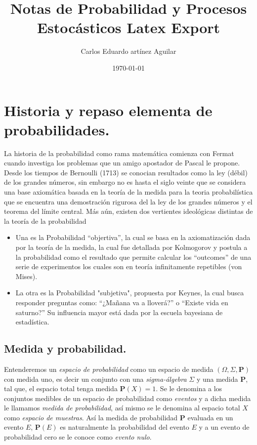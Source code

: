 \documentclass[letterpaper]{article}
\author{Carlos Eduardo artínez Aguilar}
\date{\today}
\title{Notas de Probabilidad y Procesos Estocásticos Latex Export}
\begin{document}
\maketitle
\tableofcontents


\section{Historia y repaso elementa de probabilidades.}
\label{sec:org56c8fcb}

\noindent La historia de la probabilidad como rama matemática comienza con Fermat cuando investiga los problemas que un amigo apostador de Pascal le propone. Desde los tiempos de Bernoulli (1713) se conocian resultados como la ley (débil) de los grandes números, sin embargo no es hasta el siglo veinte que se considera una base axiomática basada en la teoría de la medida para la teoria probabilística que se encuentra una demostración rigurosa del la ley de los grandes números y el teorema del límite central. Más aún, existen dos vertientes ideológicas distintas de la teoría de la probabilidad

\begin{itemize}
\item Una es la Probabilidad ``objertiva'', la cual se basa en la axiomatización dada por la teoría de la medida, la cual fue detallada por Kolmogorov y postula a la probabilidad como el resultado que permite calcular los ``outcomes'' de una serie de experimentos los cuales son en teoría infinitamente repetibles (von Mises).

\item La otra es la Probabilidad "subjetiva", propuesta por Keynes, la cual busca responder preguntas como: ``¿Mañana va a lloverá?'' o ``Existe vida en saturno?'' Su influencia mayor está dada por la escuela bayesiana de estadística.
\end{itemize}

\subsection{Medida y probabilidad.}
\label{sec:org360d1c3}

\noindent Entenderemos un \emph{espacio de probabilidad} como un espacio de medida \((\Omega,\Sigma,\textbf{P})\) con medida uno, es decir un conjunto con una \emph{sigma-álgebra} \(\Sigma\) y una medida \textbf{P}, tal que, el espacio total tenga medida \(\textbf{P}(X)=1\). Se le denomina a los conjuntos medibles de un espacio de probabilidad como \emph{eventos} y a dicha medida le llamamos \emph{medida de probabilidad}, así mismo se le denomina al espacio total \(X\) como \emph{espacio de muestras}. Así la medida de probabilidad \textbf{P} evaluada en un evento \(E\), \(\textbf{P}(E)\) es naturalmente la probabilidad del evento \(E\) y a un evento de probabilidad cero se le conoce como \emph{evento nulo}.
\end{document}
